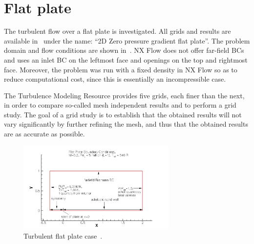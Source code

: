 \section{Flat plate}
The turbulent flow over a flat plate is investigated. All grids and results are available in~\cite{tmr} under the name: ``2D Zero pressure gradient flat plate''. The problem domain and flow conditions are shown in~. NX Flow does not offer far-field BCs and uses an inlet BC on the leftmost face and openings on the top and rightmost face. Moreover, the problem was run with a fixed density in NX Flow so as to reduce computational cost, since this is essentially an incompressible case.

The Turbulence Modeling Resource provides five grids, each finer than the next, in order to compare so-called mesh independent results and to perform a grid study. The goal of a grid study is to establish that the obtained results will not vary significantly by further refining the mesh, and thus that the obtained results are as accurate as possible.
\begin{figure}
    \centering
    \includegraphics[width=0.7\textwidth]{figs/flat/flatplate.png}
    \caption{Turbulent flat plate case~\cite{tmr}.}
    \label{fig:flat}
\end{figure}

